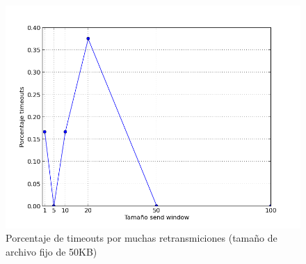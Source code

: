 \begin{figure}[H]
\begin{center}
\includegraphics[width=\textwidth,keepaspectratio]{porcentajetimeouts50.png}
\end{center}
\caption{Porcentaje de timeouts por muchas retransmiciones (tamaño de archivo fijo de 50KB)} \label{figura7}
\end{figure}

